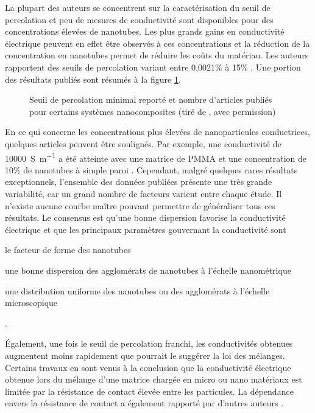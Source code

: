 La plupart des auteurs se concentrent sur la caractérisation du seuil de percolation et peu de mesures de conductivité sont disponibles pour des concentrations élevées de nanotubes. 
Les plus grands gains en conductivité électrique peuvent en effet être observés à ces concentrations et la réduction de la concentration en nanotubes permet de réduire les coûts du matériau. 
Les auteurs rapportent des seuils de percolation variant entre 0,0021\% à 15\% \cite{Bauhofer2009}. 
Une portion des résultats publiés sont résumés à la figure \ref{percolation_articles}. 

\begin{figure}[]
	\centering
	\caption{Seuil de percolation minimal reporté et nombre d'articles publiés pour certains systèmes nanocomposites (tiré de \cite{Bauhofer2009}, avec permission)}
	\label{percolation_articles}
\end{figure}

En ce qui concerne les concentrations plus élevées de nanoparticules conductrices, quelques articles peuvent être soulignés. 
Par exemple, une conductivité de \SI{10 000}{\siemens\per\metre} a été atteinte avec une matrice de PMMA et une concentration de 10\% de nanotubes à simple paroi \cite{Bauhofer2009}. 
Cependant, malgré quelques rares résultats exceptionnels, l'ensemble des données publiées présente une très grande variabilité, car un grand nombre de facteurs varient entre chaque étude.
Il n'existe aucune courbe maître pouvant permettre de généraliser tous ces résultats. 
Le consensus est qu'une bonne dispersion favorise la conductivité électrique \cite{Bauhofer2009} et que les principaux paramètres gouvernant la conductivité sont 
\begin{inparaenum}
	\item le facteur de forme des nanotubes
	\item une bonne dispersion des agglomérats de nanotubes à l'échelle nanométrique
	\item une distribution uniforme des nanotubes ou des agglomérats à l'échelle microscopique   
\end{inparaenum} \cite{Li2007a}.

Également, une fois le seuil de percolation franchi, les conductivités obtenues augmentent moins rapidement que pourrait le suggérer la loi des mélanges. 
Certains travaux \cite{Untereker2009,Cauchy2018} en sont venus à la conclusion que la conductivité électrique obtenue lors du mélange d'une matrice chargée en micro ou nano matériaux est limitée par la résistance de contact élevée entre les particules. 
La dépendance envers la résistance de contact a également rapporté par d'autres auteurs \cite{Li2007a}. 

